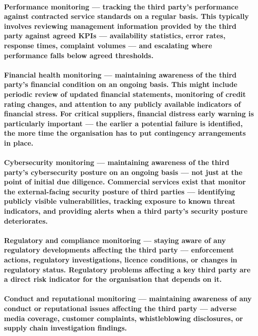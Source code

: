 \paragraph{\textbf{Performance monitoring} — tracking the third party's performance against contracted service standards on a regular basis. This typically involves reviewing management information provided by the third party against agreed KPIs — availability statistics, error rates, response times, complaint volumes — and escalating where performance falls below agreed thresholds.}
\paragraph{\textbf{Financial health monitoring} — maintaining awareness of the third party's financial condition on an ongoing basis. This might include periodic review of updated financial statements, monitoring of credit rating changes, and attention to any publicly available indicators of financial stress. For critical suppliers, financial distress early warning is particularly important — the earlier a potential failure is identified, the more time the organisation has to put contingency arrangements in place.}
\paragraph{\textbf{Cybersecurity monitoring} — maintaining awareness of the third party's cybersecurity posture on an ongoing basis — not just at the point of initial due diligence. Commercial services exist that monitor the external-facing security posture of third parties — identifying publicly visible vulnerabilities, tracking exposure to known threat indicators, and providing alerts when a third party's security posture deteriorates.}
\paragraph{\textbf{Regulatory and compliance monitoring} — staying aware of any regulatory developments affecting the third party — enforcement actions, regulatory investigations, licence conditions, or changes in regulatory status. Regulatory problems affecting a key third party are a direct risk indicator for the organisation that depends on it.}
\paragraph{\textbf{Conduct and reputational monitoring} — maintaining awareness of any conduct or reputational issues affecting the third party — adverse media coverage, customer complaints, whistleblowing disclosures, or supply chain investigation findings.}
